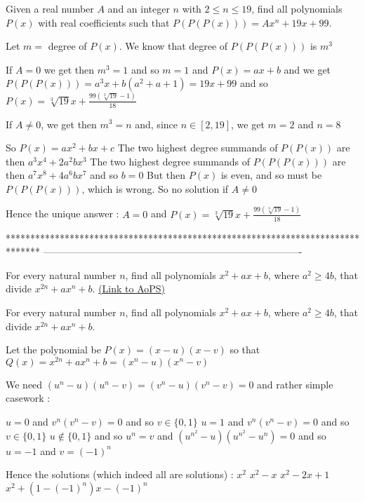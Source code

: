 \begin{solution}
	\begin{tcolorbox}Given a real number $A$ and an integer $n$ with $2 \leq n \leq 19$, find all polynomials $P(x)$ with real coefficients such that $P(P(P(x))) = Ax^n +19x+99$.\end{tcolorbox}
Let $m=$ degree of $P(x)$. We know that degree of $P(P(P(x)))$ is $m^3$

If $A=0$ we get then $m^3=1$ and so $m=1$ and $P(x)=ax+b$ and we get $P(P(P(x)))=a^3x+b(a^2+a+1)=19x+99$ and so $P(x)=\sqrt[3]{19}x+\frac{99(\sqrt[3]{19}-1)}{18}$

If $A\ne 0$, we get then $m^3=n$ and, since $n\in[2,19]$, we get $m=2$ and $n=8$

So $P(x)=ax^2+bx+c$
The two highest degree summands of $P(P(x))$ are then $a^3x^4+2a^2bx^3$
The two highest degree summands of $P(P(P(x)))$ are then $a^7x^8+4a^6bx^7$ and so $b=0$
But then $P(x)$ is even, and so must be $P(P(P(x)))$, which is wrong.
So no solution if $A\ne 0$

Hence the unique answer :
$A=0$ and $P(x)=\sqrt[3]{19}x+\frac{99(\sqrt[3]{19}-1)}{18}$
\end{solution}
*******************************************************************************
-------------------------------------------------------------------------------

\begin{problem}
	For every natural number $n$, find all polynomials $x^2+ax+b$, where $a^2 \geq 4b$, that divide $x^{2n} + ax^n + b$.
	\flushright \href{https://artofproblemsolving.com/community/c6h416292}{(Link to AoPS)}
\end{problem}



\begin{solution}
	\begin{tcolorbox}For every natural number $n$, find all polynomials $x^2+ax+b$, where $a^2 \geq 4b$, that divide $x^{2n} + ax^n + b$.\end{tcolorbox}
Let the polynomial be $P(x)=(x-u)(x-v)$ so that $Q(x)=x^{2n}+ax^n+b=(x^n-u)(x^n-v)$

We need $(u^n-u)(u^n-v)=(v^n-u)(v^n-v)=0$ and rather simple casework :

$u=0$ and $v^n(v^n-v)=0$ and so $v\in\{0,1\}$
$u=1$ and $v^n(v^n-v)=0$ and so $v\in\{0,1\}$
$u\notin\{0,1\}$ and so $u^n=v$ and $(u^{n^2}-u)(u^{n^2}-u^n)=0$ and so $u=-1$ and $v=(-1)^n$

Hence the solutions (which indeed all are solutions) :
$x^2$
$x^2-x$
$x^2-2x+1$
$x^2+(1-(-1)^n)x-(-1)^n$
\end{solution}



